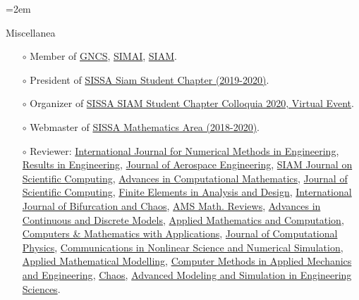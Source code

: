 \documentclass{scrartcl}
\newcommand{\Description}[1]{\hangindent=2em\hangafter=0\noindent\raggedright\footnotesize{#1}\par\normalsize\vspace{1em}} %
\begin{document}
\begin{cv}{}
\vspace{-0.5em}
\Description{{\color{cyan} Miscellanea}
\begin{itemize}
    \item[$\circ$] Member of \href{https://www.altamatematica.it/gncs/}{GNCS}, \href{https://www.simai.eu}{SIMAI}, \href{https://www.siam.org}{SIAM}.
    \item[$\circ$] President of \href{http://www.math.sissa.it/content/sissa-siam-student-chapter}{SISSA Siam Student Chapter (2019-2020)}.
    \item[$\circ$] Organizer of \href{https://www.math.sissa.it/seminar/siam-chapter-colloquia-2020}{SISSA SIAM Student Chapter Colloquia 2020, Virtual Event}.
    \item[$\circ$] Webmaster of \href{https://www.math.sissa.it/content/mathematical-analysis-modelling-and-applications-0}{SISSA Mathematics Area (2018-2020)}.
    \item[$\circ$] Reviewer: \href{https://onlinelibrary.wiley.com/journal/10970207}{ International Journal for Numerical Methods in Engineering}, \href{https://www.sciencedirect.com/journal/results-in-engineering}{Results in Engineering}, \href{https://ascelibrary.org/journal/jaeeez}{Journal of Aerospace Engineering}, \href{https://sisc.siam.org}{SIAM Journal on Scientific Computing}, \href{https://www.springer.com/journal/10444}{Advances in Computational Mathematics}, \href{https://www.springer.com/journal/10915}{Journal of Scientific Computing}, \href{https://www.sciencedirect.com/journal/finite-elements-in-analysis-and-design}{Finite Elements in Analysis and Design}, \href{https://www.worldscientific.com/worldscinet/ijbc}{International Journal of Bifurcation and Chaos}, \href{http://www.ams.org/publications/math-reviews/math-reviews}{AMS Math. Reviews}, \href{https://advancesindifferenceequations.springeropen.com}{Advances in Continuous and Discrete Models}, \href{https://www.sciencedirect.com/journal/applied-mathematics-and-computation}{Applied Mathematics and Computation}, \href{https://www.sciencedirect.com/journal/computers-and-mathematics-with-applications}{Computers \& Mathematics with Applications}, \href{https://www.sciencedirect.com/journal/journal-of-computational-physics}{Journal of Computational Physics}, \href{https://www.sciencedirect.com/journal/communications-in-nonlinear-science-and-numerical-simulation}{Communications in Nonlinear Science and Numerical Simulation}, \href{https://www.sciencedirect.com/journal/applied-mathematical-modelling}{Applied Mathematical Modelling}, \href{https://www.sciencedirect.com/journal/computer-methods-in-applied-mechanics-and-engineering}{Computer Methods in Applied Mechanics and Engineering}, \href{https://pubs.aip.org/aip/cha}{Chaos}, \href{https://amses-journal.springeropen.com}{Advanced Modeling and Simulation in Engineering Sciences}.
\end{itemize}}


\end{cv}
\end{document}
